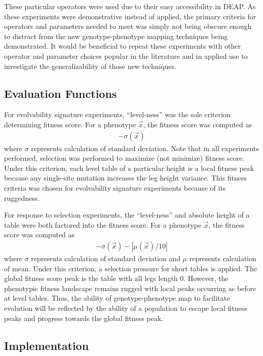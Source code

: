 These particular operators were used due to their easy accessibility in DEAP.
As these experiments were demonstrative instead of applied, the primary criteria
for operators and parameters needed to meet was simply not being obscure enough to distract from the new genotype-phenotype mapping techniques being demonstrated.
It would be beneficial to repeat these experiments with other operator and parameter choices popular in the literature and in applied use to investigate the generalizability of those new techniques.


\subsection{Evaluation Functions}

For evolvability signature experiments, ``level-ness'' was the sole criterion determining fitness score.
For a phenotype $\vec{x}$, the fitness score was computed as
\begin{align*}
-\sigma(\vec{x})
\end{align*}
where $\sigma$ represents calculation of standard deviation.
Note that in all experiments performed, selection was performed to maximize (not minimize) fitness score.
Under this criterion, each level table of a particular height is a local fitness peak because any single-site mutation increases the leg height variance.
This fitness criteria was chosen for evolvability signature experiments because of its ruggedness.

For response to selection experiments, the ``level-ness'' and absolute height of a table were both factored into the fitness score.
For a phenotype $\vec{x}$, the fitness score was computed as
\begin{align*}
-\sigma(\vec{x}) - |\mu(\vec{x})/10|
\end{align*}
where $\sigma$ represents calculation of standard deviation and $\mu$ represents calculation of mean.
Under this criterion, a selection pressure for short tables is applied.
The global fitness score peak is the table with all legs length 0.
However, the phenotypic fitness landscape remains rugged with local peaks occurring as before at level tables.
Thus, the ability of genotype-phenotype map to facilitate evolution will be reflected by the ability of a population to escape local fitness peaks and progress towards the global fitness peak.

\subsection{Implementation}

